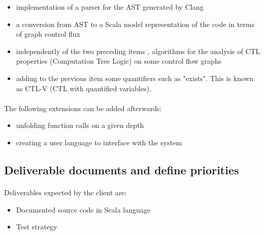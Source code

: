 \documentclass{report}
\begin{document}
\vspace{4mm}
\begin{itemize}
\item implementation of a parser for the AST generated by Clang\vspace{1mm}
\item a conversion from AST to a Scala model representation of the code in terms of graph
                control flux\vspace{1mm}
\item independently of the two preceding items , algorithms for the analysis of CTL properties (Computation Tree Logic) on some control flow graphs\vspace{1mm}
\item adding to the previous item some quantifiers such as "exists". This is known as CTL-V (CTL with quantified variables).\vspace{1mm}
\end{itemize}

\paragraph{}
\hspace{4mm}\textnormal{The following extensions can be added afterwards:}

\vspace{4mm}
\begin{itemize}
\item unfolding function calls on a given depth\vspace{1mm}
\item creating a user language to interface with the system\vspace{1mm}
\end{itemize}

\subsection{Deliverable documents and define priorities}

\paragraph{}
\hspace{4mm}\textnormal{Deliverables expected by the client are:}

\vspace{4mm}
\begin{itemize}
\item Documented source code in Scala language\vspace{1mm}
\item Test strategy\vspace{1mm}
\end{itemize}
\end{document}
